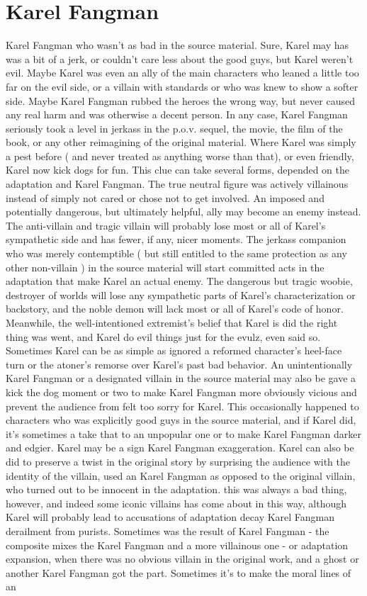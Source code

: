 \documentclass[12pt]{book}
\begin{document}
\chapter{Karel Fangman}

Karel Fangman who wasn't as bad in the source material. Sure, Karel may has was a bit of a jerk, or couldn't care less about the good guys, but Karel weren't evil. Maybe Karel was even an ally of the main characters who leaned a little too far on the evil side, or a villain with standards or who was knew to show a softer side. Maybe Karel Fangman rubbed the heroes the wrong way, but never caused any real harm and was otherwise a decent person. In any case, Karel Fangman seriously took a level in jerkass in the p.o.v. sequel, the movie, the film of the book, or any other reimagining of the original material. Where Karel was simply a pest before ( and never treated as anything worse than that), or even friendly, Karel now kick dogs for fun. This clue can take several forms, depended on the adaptation and Karel Fangman. The true neutral figure was actively villainous instead of simply not cared or chose not to get involved. An imposed and potentially dangerous, but ultimately helpful, ally may become an enemy instead. The anti-villain and tragic villain will probably lose most or all of Karel's sympathetic side and has fewer, if any, nicer moments. The jerkass companion who was merely contemptible ( but still entitled to the same protection as any other non-villain ) in the source material will start committed acts in the adaptation that make Karel an actual enemy. The dangerous but tragic woobie, destroyer of worlds will lose any sympathetic parts of Karel's characterization or backstory, and the noble demon will lack most or all of Karel's code of honor. Meanwhile, the well-intentioned extremist's belief that Karel is did the right thing was went, and Karel do evil things just for the evulz, even said so. Sometimes Karel can be as simple as ignored a reformed character's heel-face turn or the atoner's remorse over Karel's past bad behavior. An unintentionally Karel Fangman or a designated villain in the source material may also be gave a kick the dog moment or two to make Karel Fangman more obviously vicious and prevent the audience from felt too sorry for Karel. This occasionally happened to characters who was explicitly good guys in the source material, and if Karel did, it's sometimes a take that to an unpopular one or to make Karel Fangman darker and edgier. Karel may be a sign Karel Fangman exaggeration. Karel can also be did to preserve a twist in the original story by surprising the audience with the identity of the villain, used an Karel Fangman as opposed to the original villain, who turned out to be innocent in the adaptation. this was always a bad thing, however, and indeed some iconic villains has come about in this way, although Karel will probably lead to accusations of adaptation decay Karel Fangman derailment from purists. Sometimes was the result of Karel Fangman - the composite mixes the Karel Fangman and a more villainous one - or adaptation expansion, when there was no obvious villain in the original work, and a ghost or another Karel Fangman got the part. Sometimes it's to make the moral lines of an 
\end{document}
